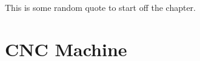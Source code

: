 \begin{savequote}[75mm] 
This is some random quote to start off the chapter.
\end{savequote}

\chapter{CNC Machine}

